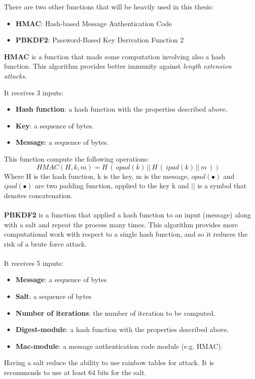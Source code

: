 There are two other functions that will be heavily used in this thesis:
\begin{itemize}
	\item \textbf{HMAC}: Hash-based Message Authentication Code
	\item \textbf{PBKDF2}: Password-Based Key Derivation Function 2
\end{itemize}
\begin{flushleft}
	\textbf{HMAC} is a function that made some computation involving also a hash function. This algorithm provides better immunity against \textit{length extension attacks}.
\end{flushleft}
It receives 3 inputs:
\begin{itemize}[label=$\odot$]
	\item \textbf{Hash function}: a hash function with the properties described above.
	\item \textbf{Key}: a sequence of bytes.
	\item \textbf{Message}: a sequence of bytes.
\end{itemize}
This function compute the following operations:
\begin{equation*}
HMAC(H,k,m)=H\, (\, opad(k) \, ||\, H\, (\, ipad(k) \, ||\,  m \, ))
\end{equation*}
Where H is the hash function, k is the key, m is the message, $opad(\bullet)$ and $ipad(\bullet)$ are two padding function, applied to the key k and $||$ is a symbol that denotes concatenation.
\\ \\
\textbf{PBKDF2} is a function that applied a hash function to an input (message) along with a salt and repeat the process many times. This algorithm provides more computational work with respect to a single hash function, and so it reduces the risk of a brute force attack.
\\ \\
It receives 5 inputs:
\begin{itemize}[label=$\odot$]
	\item \textbf{Message}: a sequence of bytes
	\item \textbf{Salt}: a sequence of bytes
	\item \textbf{Number of iterations}: the number of iteration to be computed.
	\item \textbf{Digest-module}: a hash function with the properties described above.
	\item \textbf{Mac-module}: a message authentication code  module (e.g. HMAC).
\end{itemize}
Having a salt reduce the ability to use rainbow tables for attack. It is recommends to use at least 64 bits for the salt.







